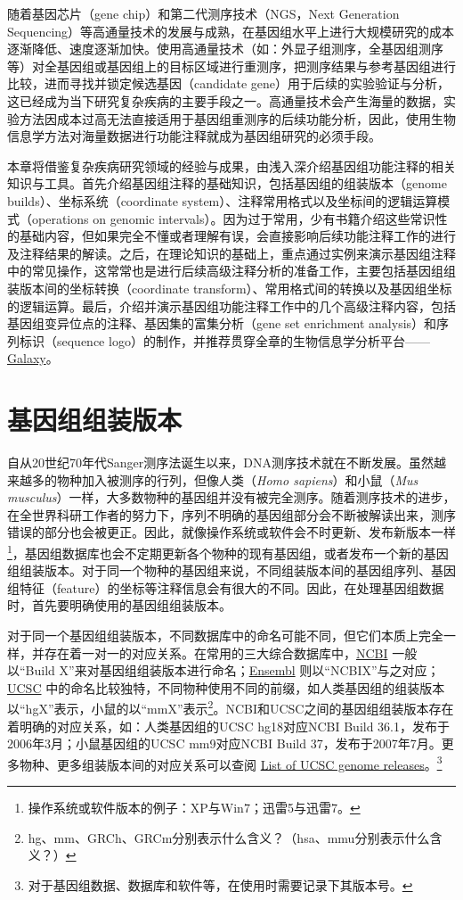 \documentclass[11pt,a4paper,twoside]{book}
\begin{document}
随着基因芯片（gene chip）和第二代测序技术（NGS，Next Generation Sequencing）等高通量技术的发展与成熟，在基因组水平上进行大规模研究的成本逐渐降低、速度逐渐加快。使用高通量技术（如：外显子组测序，全基因组测序等）对全基因组或基因组上的目标区域进行重测序，把测序结果与参考基因组进行比较，进而寻找并锁定候选基因（candidate gene）用于后续的实验验证与分析，这已经成为当下研究复杂疾病的主要手段之一。高通量技术会产生海量的数据，实验方法因成本过高无法直接适用于基因组重测序的后续功能分析，因此，使用生物信息学方法对海量数据进行功能注释就成为基因组研究的必须手段。

本章将借鉴复杂疾病研究领域的经验与成果，由浅入深介绍基因组功能注释的相关知识与工具。首先介绍基因组注释的基础知识，包括基因组的组装版本（genome builds）、坐标系统（coordinate system）、注释常用格式以及坐标间的逻辑运算模式（operations on genomic intervals）。因为过于常用，少有书籍介绍这些常识性的基础内容，但如果完全不懂或者理解有误，会直接影响后续功能注释工作的进行及注释结果的解读。之后，在理论知识的基础上，重点通过实例来演示基因组注释中的常见操作，这常常也是进行后续高级注释分析的准备工作，主要包括基因组组装版本间的坐标转换（coordinate transform）、常用格式间的转换以及基因组坐标的逻辑运算。最后，介绍并演示基因组功能注释工作中的几个高级注释内容，包括基因组变异位点的注释、基因集的富集分析（gene set enrichment analysis）和序列标识（sequence logo）的制作，并推荐贯穿全章的生物信息学分析平台—— \href{http://galaxyproject.org}{Galaxy}。

\section{基因组组装版本}
自从20世纪70年代Sanger测序法诞生以来，DNA测序技术就在不断发展。虽然越来越多的物种加入被测序的行列，但像人类（\textit{Homo sapiens}）和小鼠（\textit{Mus musculus}）一样，大多数物种的基因组并没有被完全测序。随着测序技术的进步，在全世界科研工作者的努力下，序列不明确的基因组部分会不断被解读出来，测序错误的部分也会被更正。因此，就像操作系统或软件会不时更新、发布新版本一样\footnote{操作系统或软件版本的例子：XP与Win7；迅雷5与迅雷7。}，基因组数据库也会不定期更新各个物种的现有基因组，或者发布一个新的基因组组装版本。对于同一个物种的基因组来说，不同组装版本间的基因组序列、基因组特征（feature）的坐标等注释信息会有很大的不同。因此，在处理基因组数据时，首先要明确使用的基因组组装版本。

对于同一个基因组组装版本，不同数据库中的命名可能不同，但它们本质上完全一样，并存在着一对一的对应关系。在常用的三大综合数据库中，\href{http://www.ncbi.nlm.nih.gov}{NCBI} 一般以“Build X”来对基因组组装版本进行命名；\href{http://www.ensembl.org/index.html}{Ensembl} 则以“NCBIX”与之对应；\href{http://genome.ucsc.edu}{UCSC} 中的命名比较独特，不同物种使用不同的前缀，如人类基因组的组装版本以“hgX”表示，小鼠的以“mmX”表示\footnote{hg、mm、GRCh、GRCm分别表示什么含义？（hsa、mmu分别表示什么含义？）}。NCBI和UCSC之间的基因组组装版本存在着明确的对应关系，如：人类基因组的UCSC hg18对应NCBI Build 36.1，发布于2006年3月；小鼠基因组的UCSC mm9对应NCBI Build 37，发布于2007年7月。更多物种、更多组装版本间的对应关系可以查阅 \href{http://genome.ucsc.edu/FAQ/FAQreleases.html\#release1}{List of UCSC genome releases}。\footnote{对于基因组数据、数据库和软件等，在使用时需要记录下其版本号。}
\end{document}
